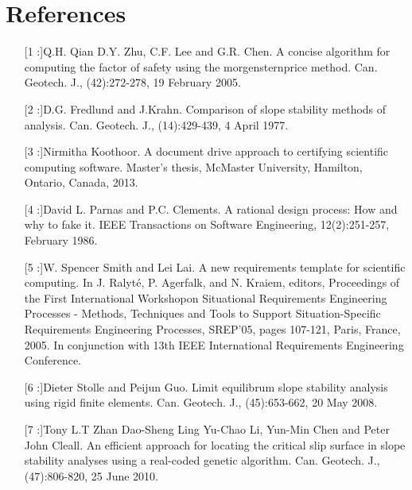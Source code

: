 \documentclass[12pt]{article}
\begin{document}
\section{References}
\label{Sec:Refe}
\begin{itemize}
\item[[1]:]Q.H. Qian D.Y. Zhu, C.F. Lee and G.R. Chen. A concise algorithm for computing the factor of safety using the morgensternprice method. Can. Geotech. J., (42):272-278, 19 February 2005.
\item[[2]:]D.G. Fredlund and J.Krahn. Comparison of slope stability methods of analysis. Can. Geotech. J., (14):429-439, 4 April 1977.
\item[[3]:]Nirmitha Koothoor. A document drive approach to certifying scientific computing software. Master's thesis, McMaster University, Hamilton, Ontario, Canada, 2013.
\item[[4]:]David L. Parnas and P.C. Clements. A rational design process: How and why to fake it. IEEE Transactions on Software Engineering, 12(2):251-257, February 1986.
\item[[5]:]W. Spencer Smith and Lei Lai. A new requirements template for scientific computing. In J. Ralyt\'{e}, P. Agerfalk, and N. Kraiem, editors, Proceedings of the First International Workshopon Situational Requirements Engineering Processes - Methods, Techniques and Tools to Support Situation-Specific Requirements Engineering Processes, SREP'05, pages 107-121, Paris, France, 2005. In conjunction with 13th IEEE International Requirements Engineering Conference.
\item[[6]:]Dieter Stolle and Peijun Guo. Limit equilibrum slope stability analysis using rigid finite elements. Can. Geotech. J., (45):653-662, 20 May 2008.
\item[[7]:]Tony L.T Zhan Dao-Sheng Ling Yu-Chao Li, Yun-Min Chen and Peter John Cleall. An efficient approach for locating the critical slip surface in slope stability analyses using a real-coded genetic algorithm. Can. Geotech. J., (47):806-820, 25 June 2010.
\end{itemize}
\end{document}
